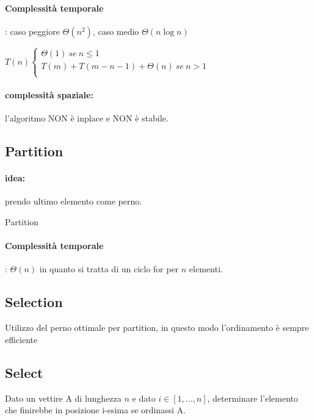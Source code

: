 \documentclass{article}
\begin{document}
\paragraph{Complessità temporale}: caso peggiore $\Theta(n^2)$, caso medio $\Theta(n \log n)$

$T(n)\begin{cases}
    \Theta(1) \ se \ n \leq 1\\
    T(m) + T(m-n-1) + \Theta(n) \ se \ n > 1\\
\end{cases}$

\paragraph{complessità spaziale:} l'algoritmo NON è inplace e NON è stabile.

\hypertarget{partition}{\subsection{Partition}} %
\paragraph{idea:} prendo ultimo elemento come perno. 

\begin{algorithm}[H]
\caption{Partition}
\end{algorithm}

\paragraph{Complessità temporale}: $\Theta(n)$ in quanto si tratta di un ciclo for per $n$ elementi.

\hypertarget{selection}{}\subsection{Selection} %
Utilizzo del perno ottimale per partition, in questo modo l'ordinamento è sempre efficiente


\hypertarget{select}{}\subsection{Select} %
Dato un vettire A di lunghezza $n$ e dato $i \in [1,...,n]$, determinare l'elemento che finirebbe in posizione i-esima se ordinassi A. 
\end{document}
